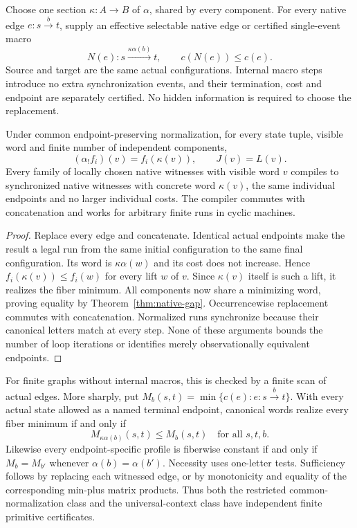 \begin{definition}
Choose one section $\kappa:A\to B$ of $\alpha$, shared by every
component. For every native edge $e:s\xrightarrow{b}t$, supply an
effective selectable native edge or certified single-event macro
\[
 N(e):s\xrightarrow{\kappa\alpha(b)}t,
 \qquad c(N(e))\leq c(e).
\]
Source and target are the same actual configurations. Internal macro steps
introduce no extra synchronization events, and their termination, cost
and endpoint are separately certified. No hidden information is required
to choose the replacement.
\end{definition}

\begin{theorem}
\label{thm:native-normal}
Under common endpoint-preserving normalization, for every state tuple,
visible word and finite number of independent components,
\[
 (\alpha_!f_i)(v)=f_i(\kappa(v)),\qquad J(v)=L(v).
\]
Every family of locally chosen native witnesses with visible word $v$
compiles to synchronized native witnesses with concrete word $\kappa(v)$,
the same individual endpoints and no larger individual costs. The compiler
commutes with concatenation and works for arbitrary finite runs in cyclic
machines.
\end{theorem}
\begin{proof}
Replace every edge and concatenate. Identical actual endpoints make the
result a legal run from the same initial configuration to the same final
configuration. Its word is $\kappa\alpha(w)$ and its cost does not
increase. Hence $f_i(\kappa(v))\leq f_i(w)$ for every lift $w$ of $v$.
Since $\kappa(v)$ itself is such a lift, it realizes the fiber minimum.
All components now share a minimizing word, proving equality by
Theorem~\ref{thm:native-gap}. Occurrencewise replacement commutes with
concatenation. Normalized runs synchronize because their canonical letters
match at every step. None of these arguments bounds the number of loop
iterations or identifies merely observationally equivalent endpoints.
\end{proof}

For finite graphs without internal macros, this is checked by a finite
scan of actual edges. More sharply, put
$M_b(s,t)=\min\{c(e):e:s\xrightarrow b t\}$. With every actual state
allowed as a named terminal endpoint, canonical words realize every fiber
minimum if and only if
\[
 M_{\kappa\alpha(b)}(s,t)\leq M_b(s,t)\quad\text{for all }s,t,b.
\]
Likewise every endpoint-specific profile is fiberwise constant if and only
if $M_b=M_{b'}$ whenever $\alpha(b)=\alpha(b')$.
Necessity uses one-letter tests. Sufficiency follows by replacing each
witnessed edge, or by monotonicity and equality of the corresponding
min-plus matrix products. Thus both the restricted common-normalization
class and the universal-context class have independent finite primitive
certificates.

